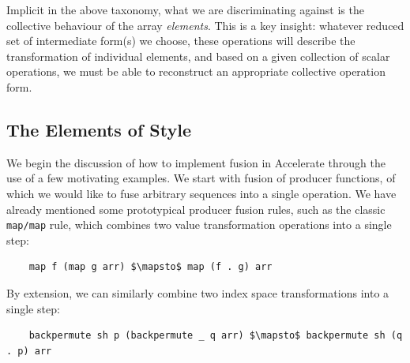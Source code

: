 Implicit in the above taxonomy, what we are discriminating against is the
collective behaviour of the array \emph{elements}. This is a key insight:
whatever reduced set of intermediate form(s) we choose, these operations will
describe the transformation of individual elements, and based on a given
collection of scalar operations, we must be able to reconstruct an appropriate
collective operation form.


\subsection{The Elements of Style}
\label{sec:elements_of_style}

We begin the discussion of how to implement fusion in Accelerate through the use
of a few motivating examples. We start with fusion of producer functions, of
which we would like to fuse arbitrary sequences into a single operation. We have
already mentioned some prototypical producer fusion rules, such as the classic
\texttt{map/map} rule, which combines two value transformation operations into a
single step:
%
\begin{lstlisting}[style=haskell,numbers=none,mathescape]
%\bf$\langle$ RULE: map/map $\rangle$%
    map f (map g arr) $\mapsto$ map (f . g) arr
\end{lstlisting}
%
By extension, we can similarly combine two index space transformations into a
single step:
%
\begin{lstlisting}[style=haskell,numbers=none,mathescape]
%\bf$\langle$ RULE: backpermute/backpermute $\rangle$%
    backpermute sh p (backpermute _ q arr) $\mapsto$ backpermute sh (q . p) arr
\end{lstlisting}

